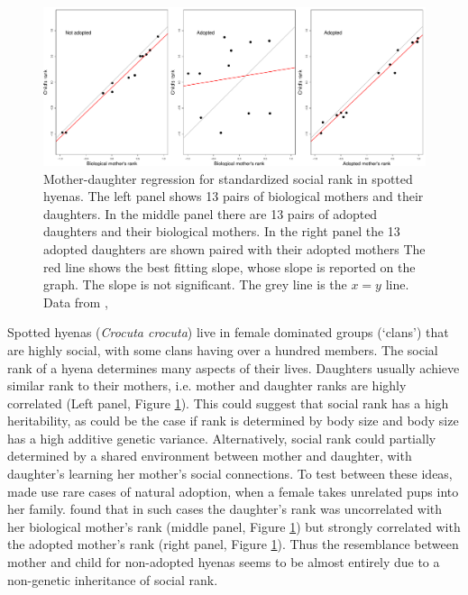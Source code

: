  \begin{figure}
\begin{center}
\includegraphics[width=\textwidth]{Journal_figs/Quant_gen/hyena_mat_effects/hyena_mat_effects.pdf}
\end{center}
\caption{Mother-daughter regression for standardized social rank in spotted
  hyenas. The left panel shows 13 pairs of biological mothers and
  their daughters. In the middle panel there are 13 pairs of adopted
  daughters and their biological mothers. In the right panel the 13
  adopted daughters are shown paired with their adopted mothers  The red line shows the best fitting
  slope, whose slope is reported on the graph. The slope is not significant. The grey line is the
  $x=y$ line. Data from \citet{east2009maternal},
  } \label{fig: hyena_mat_effects}
\end{figure}


Spotted hyenas ({\it Crocuta crocuta}) live in female dominated groups
(`clans') that are highly social, with some clans having over a
hundred members. The social rank of a hyena determines many
aspects of their lives. Daughters usually achieve similar rank to
their mothers, i.e. mother and daughter ranks are highly
correlated (Left panel, Figure \ref{fig: hyena_mat_effects}). This could suggest that social rank has a high 
heritability, as could be the case if rank is determined by body size and body size
has a high additive genetic variance. Alternatively, social rank could
partially determined by a shared environment between mother and daughter, with daughter's
learning her mother's social connections. To test between these ideas,
\citet{east2009maternal} made use rare cases of natural adoption, when a
female takes unrelated pups into her
family. \citeauthor{east2009maternal} found that in such cases the
daughter's rank was uncorrelated with her biological mother's rank
(middle panel, Figure \ref{fig: hyena_mat_effects}) but strongly correlated with the adopted mother's
rank (right panel, Figure \ref{fig: hyena_mat_effects}).  Thus the resemblance between mother and child
for non-adopted hyenas seems to be almost entirely due to a
non-genetic inheritance of social rank.   

